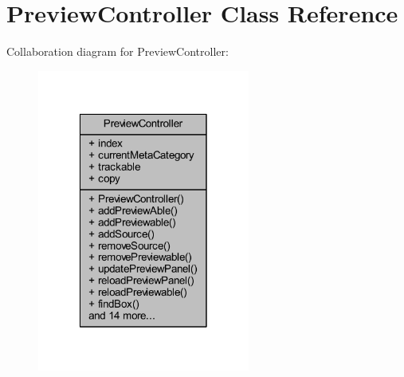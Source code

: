 \hypertarget{class_preview_controller}{\section{Preview\-Controller Class Reference}
\label{class_preview_controller}
}


Collaboration diagram for Preview\-Controller\-:
\nopagebreak
\begin{figure}[H]
\begin{center}
\leavevmode
\includegraphics[width=198pt]{class_preview_controller__coll__graph}
\end{center}
\end{figure}
